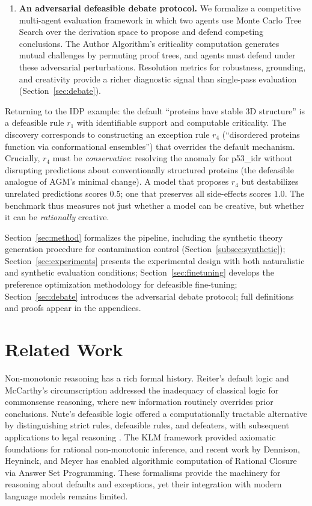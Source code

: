 \documentclass{article}
\theoremstyle{definition}
\begin{document}
\begin{enumerate}[label=(\arabic*),nosep]
    \item \textbf{An adversarial defeasible debate protocol.} We formalize a competitive multi-agent evaluation framework in which two agents use Monte Carlo Tree Search over the derivation space to propose and defend competing conclusions. The Author Algorithm's criticality computation generates mutual challenges by permuting proof trees, and agents must defend under these adversarial perturbations. Resolution metrics for robustness, grounding, and creativity provide a richer diagnostic signal than single-pass evaluation (Section~\ref{sec:debate}).
\end{enumerate}

Returning to the IDP example: the default ``proteins have stable 3D structure'' is a defeasible rule $r_1$ with identifiable support and computable criticality. The discovery corresponds to constructing an exception rule $r_4$ (``disordered proteins function via conformational ensembles'') that overrides the default mechanism. Crucially, $r_4$ must be \emph{conservative}: resolving the anomaly for p53\_idr without disrupting predictions about conventionally structured proteins (the defeasible analogue of AGM's minimal change). A model that proposes $r_4$ but destabilizes unrelated predictions scores $0.5$; one that preserves all side-effects scores $1.0$. The benchmark thus measures not just whether a model can be creative, but whether it can be \emph{rationally} creative.

Section~\ref{sec:method} formalizes the pipeline, including the synthetic theory generation procedure for contamination control (Section~\ref{subsec:synthetic}); Section~\ref{sec:experiments} presents the experimental design with both naturalistic and synthetic evaluation conditions; Section~\ref{sec:finetuning} develops the preference optimization methodology for defeasible fine-tuning; Section~\ref{sec:debate} introduces the adversarial debate protocol; full definitions and proofs appear in the appendices.


\section{Related Work}\label{sec:related}
Non-monotonic reasoning has a rich formal history. Reiter's default logic \cite{reiter1980logic} and McCarthy's circumscription \cite{mccarthy1980circumscription} addressed the inadequacy of classical logic for commonsense reasoning, where new information routinely overrides prior conclusions. Nute's defeasible logic \cite{nute1987defeasible, nute1994defeasible} offered a computationally tractable alternative by distinguishing strict rules, defeasible rules, and defeaters, with subsequent applications to legal reasoning \cite{nute1997logic}. The KLM framework \cite{kraus1990nonmonotonic} provided axiomatic foundations for rational non-monotonic inference, and recent work by Dennison, Heyninck, and Meyer \cite{dennison2026rational} has enabled algorithmic computation of Rational Closure via Answer Set Programming. These formalisms provide the machinery for reasoning about defaults and exceptions, yet their integration with modern language models remains limited.
\end{document}

